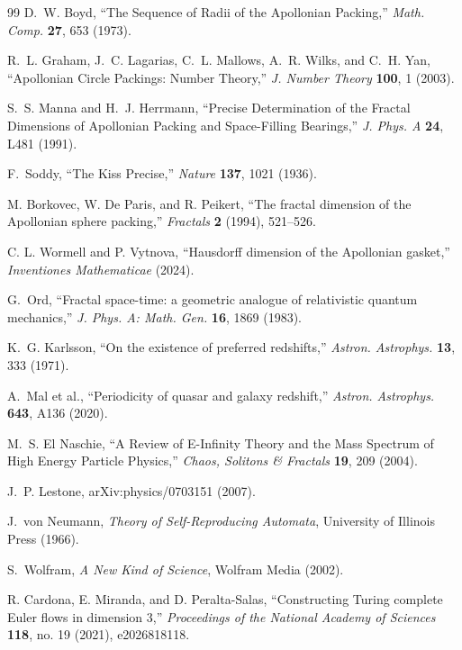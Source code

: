 \documentclass[11pt,a4paper]{article}
\begin{document}
\begin{thebibliography}{99}
D.~W. Boyd,
``The Sequence of Radii of the Apollonian Packing,''
\textit{Math. Comp.} \textbf{27}, 653 (1973).

R.~L. Graham, J.~C. Lagarias, C.~L. Mallows,
A.~R. Wilks, and C.~H. Yan,
``Apollonian Circle Packings: Number Theory,''
\textit{J. Number Theory} \textbf{100}, 1 (2003).

S.~S. Manna and H.~J. Herrmann,
``Precise Determination of the Fractal Dimensions of Apollonian Packing and Space-Filling Bearings,''
\textit{J. Phys. A} \textbf{24}, L481 (1991).

F.~Soddy,
``The Kiss Precise,''
\textit{Nature} \textbf{137}, 1021 (1936).

M. Borkovec, W. De Paris, and R. Peikert,
``The fractal dimension of the Apollonian sphere packing,''
{\em Fractals} {\bf 2} (1994), 521--526.

C. L. Wormell and P. Vytnova,
``Hausdorff dimension of the Apollonian gasket,''
{\em Inventiones Mathematicae} (2024).

G.~Ord, ``Fractal space-time: a geometric analogue of relativistic quantum
mechanics,'' \textit{J. Phys. A: Math. Gen.} \textbf{16}, 1869 (1983).

K.~G. Karlsson, ``On the existence of preferred redshifts,''
\textit{Astron. Astrophys.} \textbf{13}, 333 (1971).

A.~Mal et al., ``Periodicity of quasar and galaxy redshift,''
\textit{Astron. Astrophys.} \textbf{643}, A136 (2020).

M.~S. El Naschie,
``A Review of E-Infinity Theory and the Mass Spectrum of High Energy Particle Physics,''
\textit{Chaos, Solitons \& Fractals} \textbf{19}, 209 (2004).

J.~P. Lestone, arXiv:physics/0703151 (2007).

J.~von Neumann,
\textit{Theory of Self-Reproducing Automata},
University of Illinois Press (1966).

S.~Wolfram,
\textit{A New Kind of Science},
Wolfram Media (2002).

R. Cardona, E. Miranda, and D. Peralta-Salas, ``Constructing Turing complete Euler flows in dimension 3,'' \emph{Proceedings of the National Academy of Sciences} \textbf{118}, no. 19 (2021), e2026818118.


\end{thebibliography}
\end{document}
